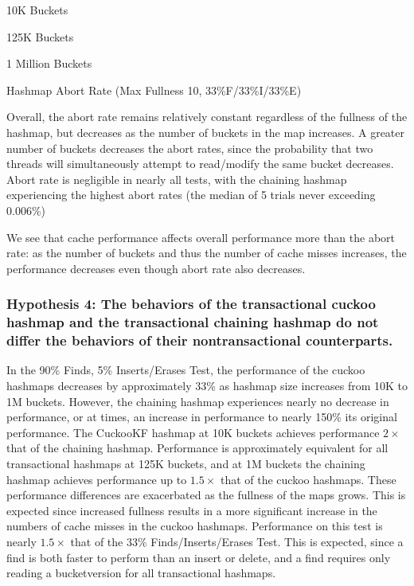     \begin{table}[t]
    \centering
        \begin{minipage}{0.45\textwidth}
        \centering
        
        \caption*{10K Buckets}
        \end{minipage}
        \begin{minipage}{0.45\textwidth}
        \centering
        
        \caption*{125K Buckets}
        \end{minipage}
        \begin{minipage}{0.45\textwidth}
        \centering
        
        \caption*{1 Million Buckets}
        \end{minipage}
        \caption{Hashmap Abort Rate (Max Fullness 10, 33\%F/33\%I/33\%E)}
    \end{table}

Overall, the abort rate remains relatively constant regardless of the fullness of the hashmap, but decreases as the number of buckets in the map increases. A greater number of buckets decreases the abort rates, since the probability that two threads will simultaneously attempt to read/modify the same bucket decreases. Abort rate is negligible in nearly all tests, with the chaining hashmap experiencing the highest abort rates (the median of 5 trials never exceeding 0.006\%)

We see that cache performance affects overall performance more than the abort rate: as the number of buckets and thus the number of cache misses increases, the performance decreases even though abort rate also decreases.

\subsubsection{Hypothesis 4: The behaviors of the transactional cuckoo hashmap and the transactional chaining hashmap do not differ the behaviors of their nontransactional counterparts. }

In the 90\% Finds, 5\% Inserts/Erases Test, the performance of the cuckoo hashmaps decreases by approximately 33\% as hashmap size increases from 10K to 1M buckets. However, the chaining hashmap experiences nearly no decrease in performance, or at times, an increase in performance to nearly 150\% its original performance. The CuckooKF hashmap at 10K buckets achieves performance $2\times$ that of the chaining hashmap. Performance is approximately equivalent for all transactional hashmaps at 125K buckets, and at 1M buckets the chaining hashmap achieves performance up to $1.5\times$ that of the cuckoo hashmaps. These performance differences are exacerbated as the fullness of the maps grows. This is expected since increased fullness results in a more significant increase in the numbers of cache misses in the cuckoo hashmaps.
 Performance on this test is nearly $1.5\times$ that of the 33\% Finds/Inserts/Erases Test. This is expected, since a find is both faster to perform than an insert or delete, and a find requires only reading a bucketversion for all transactional hashmaps.

